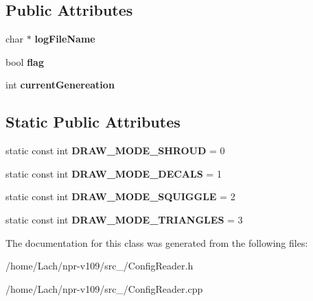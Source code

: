 \subsection*{Public Attributes}
\begin{DoxyCompactItemize}
\item 
\hypertarget{classConfigReader_adff3f922c1af68d2ff3ffb2935f9ff7b}{}\label{classConfigReader_adff3f922c1af68d2ff3ffb2935f9ff7b} 
char $\ast$ {\bfseries log\+File\+Name}
\item 
\hypertarget{classConfigReader_abab3606d626f5ae659ffd34a6ecab8c2}{}\label{classConfigReader_abab3606d626f5ae659ffd34a6ecab8c2} 
bool {\bfseries flag}
\item 
\hypertarget{classConfigReader_a1ab9194bdcf3d05cddc5ddcfe99dc08f}{}\label{classConfigReader_a1ab9194bdcf3d05cddc5ddcfe99dc08f} 
int {\bfseries current\+Genereation}
\end{DoxyCompactItemize}
\subsection*{Static Public Attributes}
\begin{DoxyCompactItemize}
\item 
\hypertarget{classConfigReader_a728af86620d2f7bd22f8f50dc576dfbc}{}\label{classConfigReader_a728af86620d2f7bd22f8f50dc576dfbc} 
static const int {\bfseries D\+R\+A\+W\+\_\+\+M\+O\+D\+E\+\_\+\+S\+H\+R\+O\+UD} = 0
\item 
\hypertarget{classConfigReader_af7fb8fa1f2cc76913afc78a2726e44a6}{}\label{classConfigReader_af7fb8fa1f2cc76913afc78a2726e44a6} 
static const int {\bfseries D\+R\+A\+W\+\_\+\+M\+O\+D\+E\+\_\+\+D\+E\+C\+A\+LS} = 1
\item 
\hypertarget{classConfigReader_a51777b70066b67ddb71b1f2a0762e20a}{}\label{classConfigReader_a51777b70066b67ddb71b1f2a0762e20a} 
static const int {\bfseries D\+R\+A\+W\+\_\+\+M\+O\+D\+E\+\_\+\+S\+Q\+U\+I\+G\+G\+LE} = 2
\item 
\hypertarget{classConfigReader_aeb8151f583f4f6b01c7c404dec49a74c}{}\label{classConfigReader_aeb8151f583f4f6b01c7c404dec49a74c} 
static const int {\bfseries D\+R\+A\+W\+\_\+\+M\+O\+D\+E\+\_\+\+T\+R\+I\+A\+N\+G\+L\+ES} = 3
\end{DoxyCompactItemize}


The documentation for this class was generated from the following files\+:\begin{DoxyCompactItemize}
\item 
/home/\+Lach/npr-\/v109/src\+\_/Config\+Reader.\+h\item 
/home/\+Lach/npr-\/v109/src\+\_/Config\+Reader.\+cpp\end{DoxyCompactItemize}
